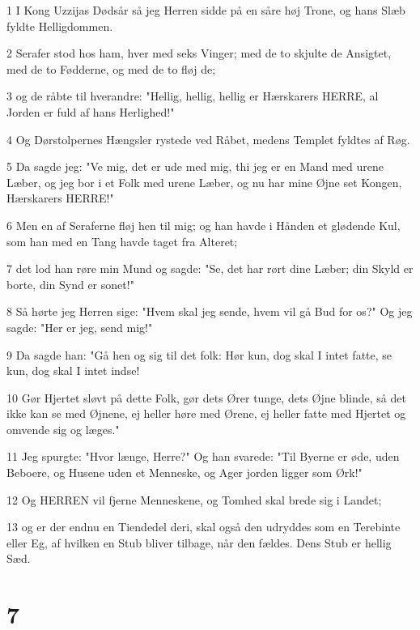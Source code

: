 \par 1 I Kong Uzzijas Dødsår så jeg Herren sidde på en såre høj Trone, og hans Slæb fyldte Helligdommen.
\par 2 Serafer stod hos ham, hver med seks Vinger; med de to skjulte de Ansigtet, med de to Fødderne, og med de to fløj de;
\par 3 og de råbte til hverandre: "Hellig, hellig, hellig er Hærskarers HERRE, al Jorden er fuld af hans Herlighed!"
\par 4 Og Dørstolpernes Hængsler rystede ved Råbet, medens Templet fyldtes af Røg.
\par 5 Da sagde jeg: "Ve mig, det er ude med mig, thi jeg er en Mand med urene Læber, og jeg bor i et Folk med urene Læber, og nu har mine Øjne set Kongen, Hærskarers HERRE!"
\par 6 Men en af Seraferne fløj hen til mig; og han havde i Hånden et glødende Kul, som han med en Tang havde taget fra Alteret;
\par 7 det lod han røre min Mund og sagde: "Se, det har rørt dine Læber; din Skyld er borte, din Synd er sonet!"
\par 8 Så hørte jeg Herren sige: "Hvem skal jeg sende, hvem vil gå Bud for os?" Og jeg sagde: "Her er jeg, send mig!"
\par 9 Da sagde han: "Gå hen og sig til det folk: Hør kun, dog skal I intet fatte, se kun, dog skal I intet indse!
\par 10 Gør Hjertet sløvt på dette Folk, gør dets Ører tunge, dets Øjne blinde, så det ikke kan se med Øjnene, ej heller høre med Ørene, ej heller fatte med Hjertet og omvende sig og læges."
\par 11 Jeg spurgte: "Hvor længe, Herre?" Og han svarede: "Til Byerne er øde, uden Beboere, og Husene uden et Menneske, og Ager jorden ligger som Ørk!"
\par 12 Og HERREN vil fjerne Menneskene, og Tomhed skal brede sig i Landet;
\par 13 og er der endnu en Tiendedel deri, skal også den udryddes som en Terebinte eller Eg, af hvilken en Stub bliver tilbage, når den fældes. Dens Stub er hellig Sæd.

\chapter{7}

